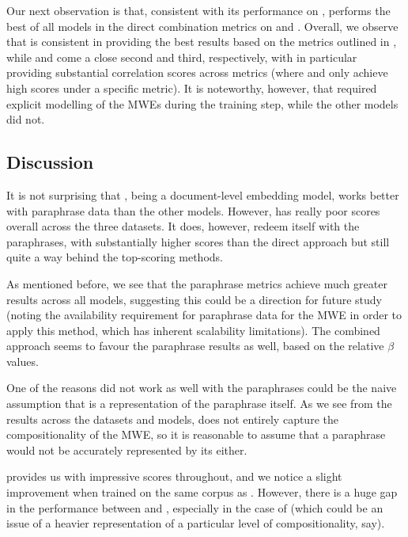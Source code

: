 Our next observation is that, consistent with its performance on \ramisch, \wordtovec performs the best of all models in the direct combination metrics on \reddy and \discoj. Overall, we observe that \wordtovec is consistent in providing the best results based on the metrics outlined in , while \fasttext and \infersent come a close second and third, respectively, with \fasttext in particular providing substantial correlation scores across metrics (where \infersent and \wordtovec only achieve high scores under a specific metric). It is noteworthy, however, that \wordtovec required explicit modelling of the MWEs during the training step, while the other models did not.

\subsection*{Discussion}
It is not surprising that \infersent, being a document-level embedding model, works better with paraphrase data than the other models. However, \doctovec has really poor scores overall across the three datasets. It does, however, redeem itself with the paraphrases, with substantially higher scores than the direct approach but still quite a way behind the top-scoring methods. 

As mentioned before, we see that the paraphrase metrics achieve much greater results across all models, suggesting this could be a direction for future study (noting the availability requirement for paraphrase data for the MWE in order to apply this method, which has inherent scalability limitations). The combined approach seems to favour the paraphrase results as well, based on the relative $\beta$ values.

One of the reasons \wordtovec did not work as well with the paraphrases could be the naive assumption that \presum is a representation of the paraphrase itself. As we see from the results across the datasets and models, \presum does not entirely capture the compositionality of the MWE, so it is reasonable to assume that a paraphrase would not be accurately represented by  its \presum either. 

\fasttext provides us with impressive scores throughout, and we notice a slight improvement when trained on the same corpus as \wordtovec. However, there is a huge gap in the performance between \wordtovec and \fasttext, especially in the case of \reddy (which could be an issue of a heavier representation of a particular level of compositionality, say).

